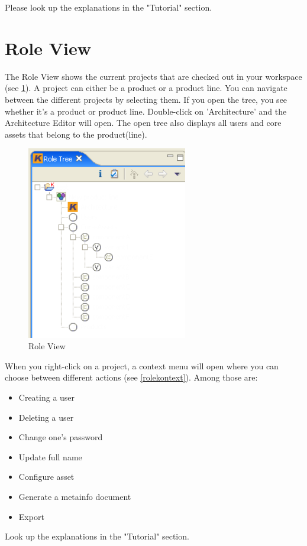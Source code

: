 Please look up the explanations in the "Tutorial" section.

\section{Role View}

The Role View shows the current projects that are checked out in your workspace 
(see \ref{roletree}).
A project can either be a product or a product line. You can navigate between the 
different projects by selecting them. If you open the tree, you see whether it's a product 
or product line. Double-click on 'Architecture' and the Architecture Editor will open. The open tree also 
displays all users and core assets that belong to the product(line).

\begin{figure}[h!]
\begin{center}
\includegraphics[width=7cm]{roletree.png}
   \caption{Role View}
\label{roletree}
\end{center}
\end{figure}\par

When you right-click on a project, a context menu will open where you can choose 
between different actions (see \ref{rolekontext}). Among those are:

\begin{itemize}
	\item Creating a user
	\item Deleting a user
	\item Change one's password
	\item Update full name
	\item Configure asset
	\item Generate a metainfo document
	\item Export
\end{itemize}
Look up the explanations in the "Tutorial" section.

